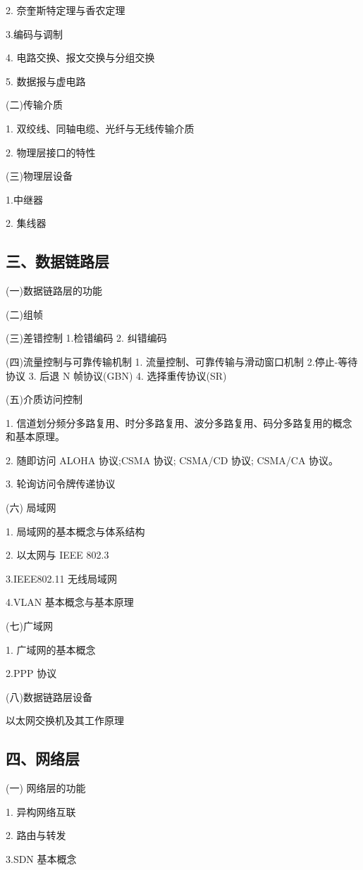 \documentclass[10pt]{article}
\begin{document}
2. 奈奎斯特定理与香农定理

3.编码与调制

4. 电路交换、报文交换与分组交换

5. 数据报与虚电路

(二)传输介质

1. 双绞线、同轴电缆、光纤与无线传输介质 

2. 物理层接口的特性

(三)物理层设备

1.中继器 

2. 集线器

\subsection*{三、数据链路层}

(一)数据链路层的功能

(二)组帧 

(三)差错控制 1.检错编码 2. 纠错编码 

(四)流量控制与可靠传输机制 1. 流量控制、可靠传输与滑动窗口机制 2.停止-等待协议 3. 后退 N 帧协议(GBN) 4. 选择重传协议(SR)

(五)介质访问控制 

1. 信道划分频分多路复用、时分多路复用、波分多路复用、码分多路复用的概念和基本原理。 

2. 随即访问 ALOHA 协议;CSMA 协议; CSMA/CD 协议; CSMA/CA 协议。 

3. 轮询访问令牌传递协议

(六) 局域网

1. 局域网的基本概念与体系结构

2. 以太网与 IEEE 802.3 

3.IEEE802.11 无线局域网 

4.VLAN 基本概念与基本原理

(七)广域网

1. 广域网的基本概念

2.PPP 协议

(八)数据链路层设备

以太网交换机及其工作原理

\subsection*{四、网络层}

(一) 网络层的功能

1. 异构网络互联

2. 路由与转发

3.SDN 基本概念
\end{document}
